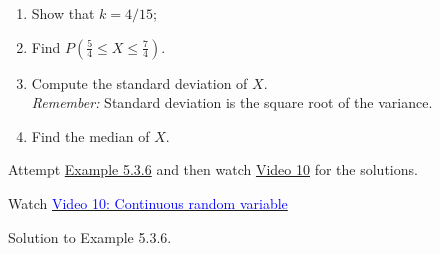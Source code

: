 \documentclass[
]{book}
\providecommand{\tightlist}{%
  \setlength{\itemsep}{0pt}\setlength{\parskip}{0pt}}
\begin{document}
\begin{enumerate}
\def\labelenumi{\arabic{enumi}.}
\tightlist
\item
  Show that \(k =4/15\);\\
\item
  Find \(P (\frac{5}{4}\le X \le \frac{7}{4})\).
\item
  Compute the standard deviation of \(X\).\\
  \emph{Remember:} Standard deviation is the square root of the variance.\\
\item
  Find the median of \(X\).\\
\end{enumerate}

Attempt \protect\hyperlink{rv:exer:cts_example}{Example 5.3.6} and then watch \protect\hyperlink{video10}{Video 10} for the solutions.

Watch \href{https://mediaspace.nottingham.ac.uk/media/Continuous+Distribution+FINAL+VERSION/1_m4k87ypu}{\textcolor{blue}{Video 10: Continuous random variable}}

Solution to Example 5.3.6.
\end{document}
